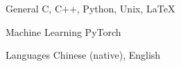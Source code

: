 

\begin{cvskills}

  \cvskill
    {General} %
    {C, C++, Python, Unix, LaTeX} %

  \cvskill
    {Machine Learning} %
    {PyTorch} %



  \cvskill
    {Languages} %
    {Chinese (native), English} %

\end{cvskills}

